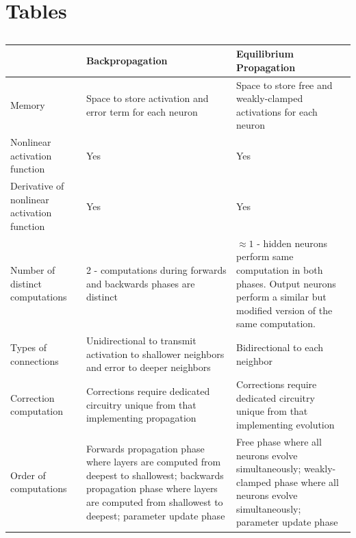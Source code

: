 \documentclass[utf8]{frontiersSCNS}
\begin{document}
\section*{Tables}
\begin{table}[h!]
\begin{center}
\begin{tabular}{|L||L|L|}
\hline 
&Backpropagation & Equilibrium Propagation \\ \hline\hline
Memory & Space to store activation and error term for each neuron & Space to store free and weakly-clamped activations for each neuron \\ \hline
Nonlinear activation function & Yes & Yes \\ \hline
Derivative of nonlinear activation function & Yes & Yes \\ \hline
Number of distinct computations & 2 - computations during forwards and backwards phases are distinct & $\approx 1$ - hidden neurons perform same computation in both phases. Output neurons perform a similar but modified version of the same computation. \\ \hline
Types of connections & Unidirectional to transmit activation to shallower neighbors and error to deeper neighbors & Bidirectional to each neighbor \\ \hline
Correction computation & Corrections require dedicated circuitry unique from that implementing propagation & Corrections require dedicated circuitry unique from that implementing evolution \\ \hline
Order of computations & Forwards propagation phase where layers are computed from deepest to shallowest; backwards propagation phase where layers are computed from shallowest to deepest; parameter update phase & Free phase where all neurons evolve simultaneously; weakly-clamped phase where all neurons evolve simultaneously; parameter update phase \\ \hline
\end{tabular}
\end{center}
\caption{} \label{table:bp_eqp_contrast}
\end{table}
\end{document}
